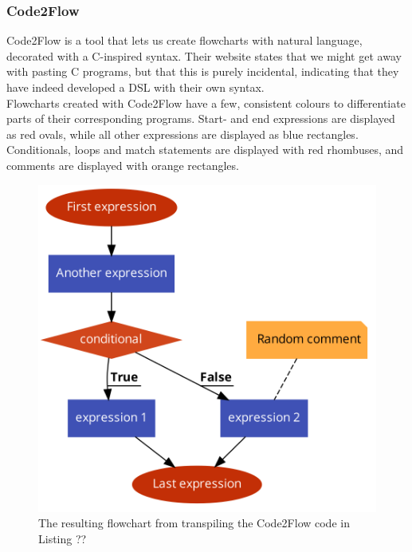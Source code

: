 
\subsubsection{Code2Flow}

Code2Flow is a tool that lets us create flowcharts with natural language, decorated with a C-inspired syntax. Their website states that we might get away with pasting C programs, but that this is purely incidental, indicating that they have indeed developed a DSL with their own syntax. \\

Flowcharts created with Code2Flow have a few, consistent colours to differentiate parts of their corresponding programs. Start- and end expressions are displayed as red ovals, while all other expressions are displayed as blue rectangles. Conditionals, loops and match statements are displayed with red rhombuses, and comments are displayed with orange rectangles. \\

\begin{figure}[ht]
    \centering
    \includegraphics[scale=0.2]{assets/code2flow_example.png}
    \caption{The resulting flowchart from transpiling the Code2Flow code in Listing ??}
    \label{fig:code2flow}
\end{figure}

